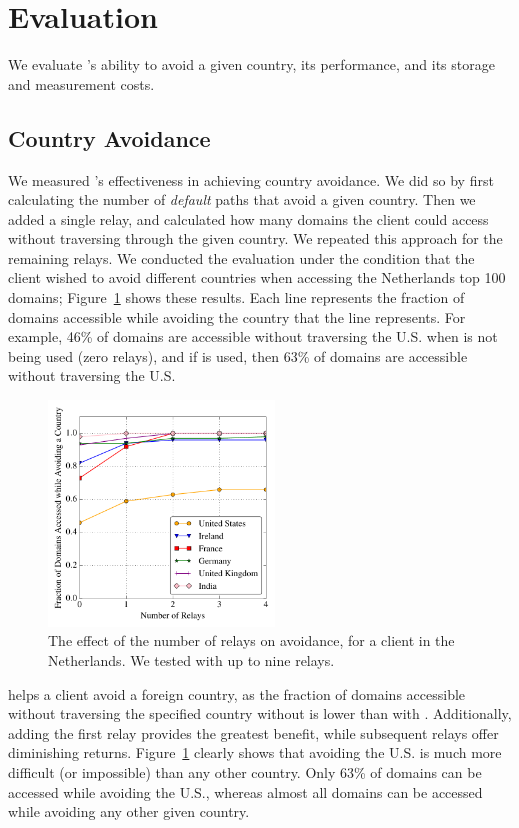 \section{Evaluation}

We evaluate \system{}'s ability to avoid a given country, its performance,
and its storage and measurement costs.

\subsection{Country Avoidance}

We measured \system{}'s effectiveness in achieving country avoidance.  We did so by first 
calculating the number of {\it default} paths that avoid a given country.  Then 
we added a single relay, and calculated how many domains the client could 
access without traversing through the given country.  We repeated this approach for 
the remaining relays.  We conducted the evaluation under the condition that 
the client wished to avoid different countries when accessing the Netherlands top 
100 domains; Figure~\ref{fig:avoidance_eval} shows these results.  Each 
line represents the fraction of domains accessible while avoiding the country that 
the line represents.  For example, 46\% of domains are accessible without traversing 
the U.S. when \system{} is not being used (zero relays), and if \system{} is 
used, then 63\% of domains are accessible without traversing the U.S.

\begin{figure}[t!]
\tiny
\centering
\includegraphics[width=.5\textwidth,height=6cm]{avoidance_n_relays}
\caption{The effect of the number of relays on avoidance, for a client
  in the Netherlands. We tested \system{} with up to nine relays.}
\label{fig:avoidance_eval}
\end{figure}

\system{} helps a client avoid a foreign country,
as the fraction of domains accessible without traversing the specified
country without \system{} is lower than with \system{}.  Additionally,
adding the first relay provides the greatest benefit, while subsequent
relays offer diminishing returns.  Figure~\ref{fig:avoidance_eval}
clearly shows that avoiding the U.S. is much more difficult (or
impossible) than any other country.  Only 63\% of domains can be
accessed while avoiding the U.S., whereas almost all domains can be
accessed while avoiding any other given country.


